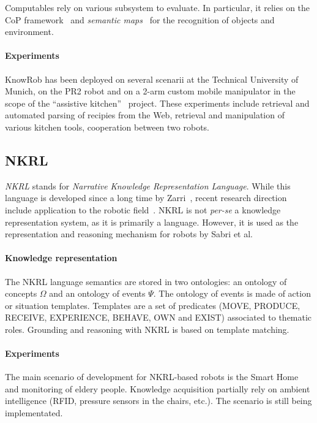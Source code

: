 \documentclass[journal]{IEEEtran}
\begin{document}
Computables rely on various subsystem to evaluate. In particular, it relies on
the CoP framework~\cite{Klank2009} and \emph{semantic maps}~\cite{Blodow2011}
for the recognition of objects and environment.


\paragraph{Experiments} {\sc KnowRob} has been deployed on several scenarii at
the Technical University of Munich, on the PR2 robot and on a 2-arm custom
mobile manipulator in the scope of the ``assistive kitchen''~\cite{Beetz2008}
project. These experiments include retrieval and automated parsing of recipies
from the Web, retrieval and manipulation of various kitchen tools, cooperation
between two robots.

\subsection{NKRL}
\label{sect|nkrl}

\emph{NKRL} stands for \emph{Narrative Knowledge Representation Language}.
While this language is developed since a long time by Zarri~\cite{Zarri1997,
Zarri2008}, recent research direction include application to the robotic
field~\cite{Sabri2011}. NKRL is not {\it per-se} a knowledge representation
system, as it is primarily a language. However, it is used as the
representation and reasoning mechanism for robots by Sabri et al.

\paragraph{Knowledge representation} The NKRL language semantics are stored in
two ontologies: an ontology of concepts $\Omega$ and an ontology of events
$\Psi$. The ontology of events is made of action or situation templates.
Templates are a set of predicates (MOVE, PRODUCE, RECEIVE, EXPERIENCE, BEHAVE,
OWN and EXIST) associated to thematic roles. Grounding and reasoning with NKRL
is based on template matching.

\paragraph{Experiments} The main scenario of development for NKRL-based robots
is the Smart Home and monitoring of eldery people. Knowledge acquisition
partially rely on ambient intelligence (RFID, pressure sensors in the chairs,
etc.). The scenario is still being implementated.
\end{document}
